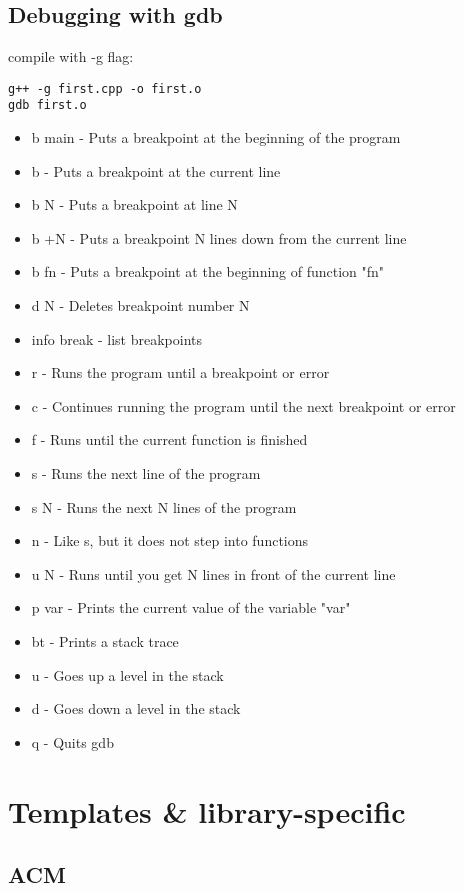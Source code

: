 \documentclass[a4paper,titlepage]{article}
\begin{document}
\newpage\subsection{Debugging with gdb}
compile with -g flag:
\begin{verbatim}
g++ -g first.cpp -o first.o
gdb first.o
\end{verbatim}
\begin{itemize}
\item b main - Puts a breakpoint at the beginning of the program
\item b - Puts a breakpoint at the current line
\item b N - Puts a breakpoint at line N
\item b +N - Puts a breakpoint N lines down from the current line
\item b fn - Puts a breakpoint at the beginning of function "fn"
\item d N - Deletes breakpoint number N
\item info break - list breakpoints
\item r - Runs the program until a breakpoint or error
\item c - Continues running the program until the next breakpoint or error
\item f - Runs until the current function is finished
\item s - Runs the next line of the program
\item s N - Runs the next N lines of the program
\item n - Like s, but it does not step into functions
\item u N - Runs until you get N lines in front of the current line
\item p var - Prints the current value of the variable "var"
\item bt - Prints a stack trace
\item u - Goes up a level in the stack
\item d - Goes down a level in the stack
\item q - Quits gdb
\end{itemize}


\newpage\section{Templates \& library-specific}
\subsection{ACM}

\end{document}

